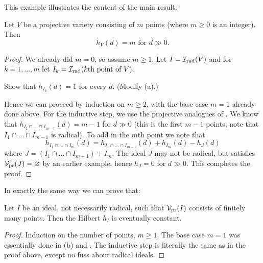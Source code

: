 This example illustrates the content of the main result:
\begin{theorem}
	Let $V$ be a projective variety consisting of $m$ points
	(where $m \ge 0$ is an integer).
	Then \[ h_V(d) = m \text{ for $d \gg 0$}. \]
\end{theorem}
\begin{proof}
	We already did $m = 0$, so assume $m \ge 1$.
	Let $I = \mathcal I_{\text{rad}}(V)$ and for $k=1,\dots,m$
	let $I_k = \mathcal I_{\text{rad}}(\text{$k$th point of $V$})$.
	\begin{exercise}
		Show that $h_{I_k} (d) = 1$ for every $d$.
		(Modify (a).)
		\label{ques:hilbert_always_one}
	\end{exercise}

	Hence we can proceed by induction on $m \ge 2$,
	with the base case $m=1$ already done above.
	For the inductive step,
	we use the projective analogues of .
	We know that $h_{I_1 \cap \dots \cap I_{m-1}}(d) = m-1$ for $d \gg 0$
	(this is the first $m-1$ points;
	note that $I_1 \cap \dots \cap I_{m-1}$ is radical).
	To add in the $m$th point we note that
	\[
		h_{I_1 \cap \dots \cap I_m}(d)
		= h_{I_1 \cap \dots \cap I_{m-1}}(d) + h_{I_m}(d)
		- h_J(d)
	\]
	where $J = (I_1 \cap \dots \cap I_{m-1}) + I_m$.
	The ideal $J$ may not be radical, but satisfies $\mathcal V_{\text{pr}}(J) = \varnothing$
	by an earlier example, hence $h_J = 0$ for $d \gg 0$.
	This completes the proof.
\end{proof}
In exactly the same way we can prove that:
\begin{corollary}[$h_I$ eventually constant when $\dim \Vp(I) = 0$]
	Let $I$ be an ideal, not necessarily radical,
	such that $\mathcal V_{\text{pr}}(I)$ consists of finitely many points.
	Then the Hilbert $h_I$ is eventually constant.
\end{corollary}
\begin{proof}
	Induction on the number of points, $m \ge 1$.
	The base case $m = 1$ was essentially done in (b)
	and .
	The inductive step is literally the same as in the proof above,
	except no fuss about radical ideals.
\end{proof}

